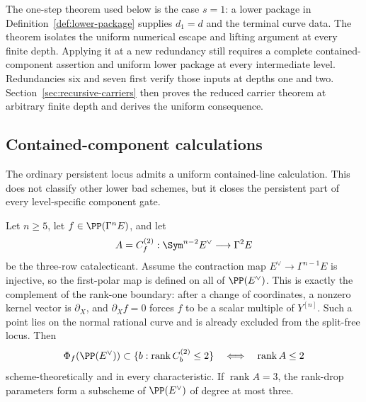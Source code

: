The one-step theorem used below is the case \(s=1\): a lower package in
Definition~\ref{def:lower-package} supplies \(d_1=d\) and the terminal
curve data.  The theorem isolates the uniform numerical escape and
lifting argument at every finite depth.  Applying it at a new
redundancy still requires a complete contained-component assertion and
uniform lower package at every intermediate level.  Redundancies six and
seven first verify those inputs at depths one and two.
Section~\ref{sec:recursive-carriers} then proves the reduced carrier theorem
at arbitrary finite depth and derives the uniform consequence.


\subsection{Contained-component calculations}

The ordinary persistent locus admits a uniform contained-line
calculation.  This does not classify other lower bad schemes, but it
closes the persistent part of every level-specific component gate.

\begin{proposition}
\label{supp:prop:contained-rank-two}%
%
Let $n\geq5$, let $f\in\PP(\Gamma^nE)$, and let
\[
 A=C_f^{(2)}:\Sym^{n-2}E^\vee\longrightarrow\Gamma^2E
\]
be the three-row catalecticant.  Assume the contraction map
$E^\vee\to\Gamma^{n-1}E$ is injective, so the first-polar map is
defined on all of $\PP(E^\vee)$.  This is exactly the complement of
the rank-one boundary: after a change of coordinates, a nonzero
kernel vector is $\partial_X$, and
$\partial_Xf=0$ forces $f$ to be a scalar multiple of $Y^{[n]}$.
Such a point lies on the normal rational curve and is already excluded
from the split-free locus.  Then
\[
\Phi_f(\PP(E^\vee))\subset
\{b:\operatorname{rank}C_b^{(2)}\leq2\}
\quad\Longleftrightarrow\quad
\operatorname{rank}A\leq2
\]
scheme-theoretically and in every characteristic.  If
$\operatorname{rank}A=3$, the rank-drop parameters form a subscheme of
$\PP(E^\vee)$ of degree at most three.
\end{proposition}

